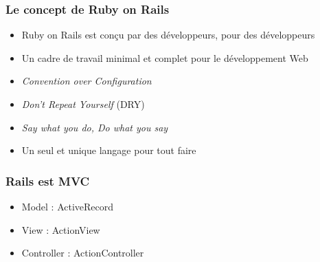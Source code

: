 \documentclass{beamer}
\begin{document}
\begin{frame}
    \frametitle{Le concept de Ruby on Rails}
    \begin{itemize}
        \item Ruby on Rails est conçu par des développeurs, pour des développeurs
        \item Un cadre de travail minimal et complet pour le développement Web
        \item \emph{Convention over Configuration}
        \item \emph{Don't Repeat Yourself} (DRY)
        \item \emph{Say what you do, Do what you say}
        \item Un seul et unique langage pour tout faire
    \end{itemize}
\end{frame}

\begin{frame}
    \frametitle{Rails est MVC}
    \begin{itemize}
        \item Model : ActiveRecord
        \item View : ActionView
        \item Controller : ActionController
    \end{itemize}
\end{frame}
\end{document}

